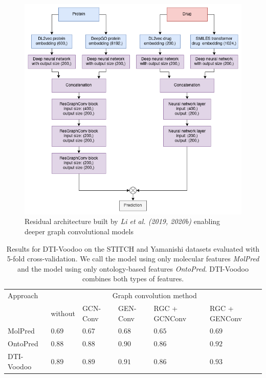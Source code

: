 \documentclass[]{article}
\newcommand{\name}{DTI-Voodoo}
\begin{document}
\begin{figure}[ht]%
	\centerline{\includegraphics[width=1\columnwidth]{../figures/full_model_all_layers.png}}
	\caption{Residual architecture built by \textit{Li et al. (2019, 2020b)} enabling deeper graph convolutional models}
	\label{fig:FullModelAllLayers}
\end{figure}

\begin{table}[ht]
	\centering

	\begin{tabular}{|p{2.0cm}|p{1.1cm}|p{0.8cm}|p{0.8cm}|p{1.2cm}|p{1.2cm}|}
		\hline
		Approach&\multicolumn{5}{c|}{Graph convolution method}\\
		&without&GCN-Conv&GEN-Conv&RGC + GCNConv&RGC + GENConv\\
		\hline
		MolPred & $0.69$ & $0.67$& $0.68$& $0.65$& $0.69$\\
		\hline
		OntoPred &$0.88$ &$0.88$&$0.90$&$0.86$&$0.92$\\
		\hline
		\name& $0.89$& $0.89$& $0.91$& $0.86$& $\mathbf{0.93}$\\
		\hline
	\end{tabular}
	\caption{\label{tab:Results}Results for \name{} on the STITCH
		and Yamanishi datasets evaluated with 5-fold cross-validation. We 
		call the model using only molecular features
		\textit{MolPred} and the model using only ontology-based
		features \textit{OntoPred}. \name{} combines both types of
		features.}
\end{table}
\end{document}
